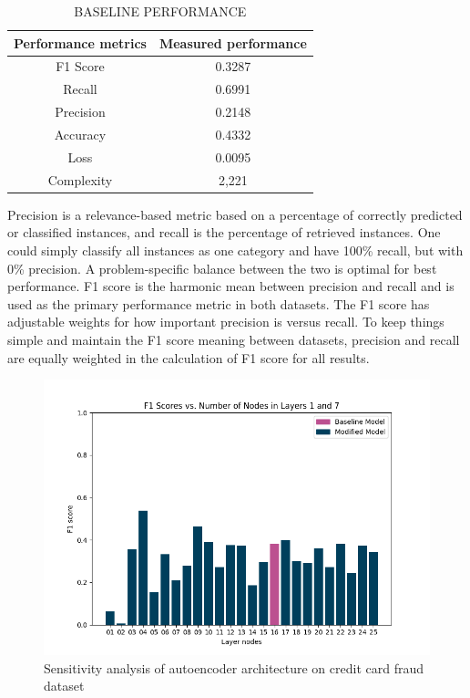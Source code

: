 \documentclass[conference]{IEEEtran}
\begin{document}
\begin{table}
    \caption{BASELINE PERFORMANCE}
    \label{tab:baseline_metrics}
    \begin{center}
        \begin{tabular}{ |c|c| }
            \hline
            Performance metrics & Measured performance \\
            \hline
            F1 Score & 0.3287 \\
            \hline
            Recall & 0.6991 \\
            \hline
            Precision & 0.2148 \\
            \hline
            Accuracy & 0.4332 \\
            \hline
            Loss & 0.0095 \\
            \hline
            Complexity & 2,221 \\
            \hline

        \end{tabular}
    \end{center}
\end{table}

Precision is a relevance-based metric based on a percentage of correctly predicted or classified instances, and recall is the percentage of retrieved instances. One could simply classify all instances as one category and have 100\% recall, but with 0\% precision. A problem-specific balance between the two is optimal for best performance. F1 score is the harmonic mean between precision and recall and is used as the primary performance metric in both datasets. The F1 score has adjustable weights for how important precision is versus recall. To keep things simple and maintain the F1 score meaning between datasets, precision and recall are equally weighted in the calculation of F1 score for all results.

\begin{figure}
    \includegraphics[width=\linewidth]{sensitivity_baseline_fraud_1.png}
    \caption{Sensitivity analysis of autoencoder architecture on credit card fraud dataset}
    \label{fig:sensitivity_fraud_1}
\end{figure}
\end{document}
